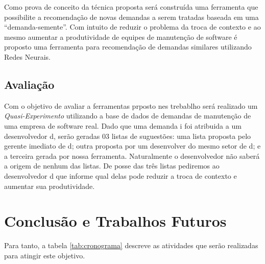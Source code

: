 \documentclass[msc,proposal,hidelot,hideabstract]{ppgccufmg} %
\begin{document}
Como prova de conceito da técnica proposta será construída uma ferramenta que
possibilite a recomendação de novas demandas a serem tratadas baseada em uma
``demanda-semente''. Com intuito de reduzir o problema da troca de contexto e
ao mesmo aumentar a produtividade de equipes de manutenção de software é
proposto uma ferramenta para recomendação de demandas similares utilizando Redes Neurais.

\section{Avaliação}
\label{sec:avaliacao}

Com o objetivo de avaliar a ferramentas prposto nes trebablho será realizado um
\textit{Quasi-Experimento} \cite{wohlin2012experimentation} utilizando a base de dados de demandas de manutenção de uma empresa
de software real. Dado que uma demanda i foi atribuida a um desenvolvedor d,
serão geradas 03 listas de suguestões: uma lista proposta pelo gerente imediato
de d; outra proposta por um desenvolver do mesmo setor de d; e a terceira
gerada por nossa ferramenta. Naturalmente o desenvolvedor não saberá a origem
de nenhum das listas.  De posse das três listas pediremos ao
desenvolvedor d que informe qual delas pode reduzir a troca de contexto e
aumentar sua produtividade.

\chapter{Conclusão e Trabalhos Futuros}
\label{ch:conclusao_trab_futuros}

Para tanto, a tabela \ref{tab:cronograma} descreve as atividades que serão realizadas para atingir este objetivo.
\end{document}
